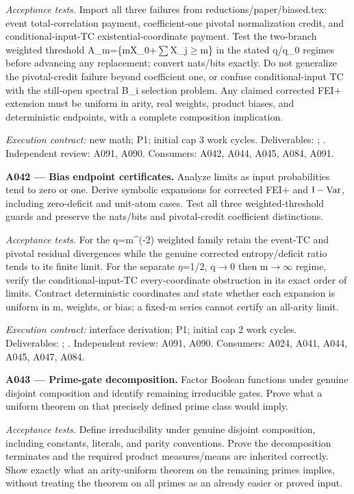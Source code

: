 \documentclass[11pt]{article}
\newcommand{\Var}{\operatorname{Var}}\newcommand{\wh}[1]{\widehat{#1}}
\begin{document}
\emph{Acceptance tests.} Import all three failures from reductions/paper/biased.tex: event total-correlation payment, coefficient-one pivotal normalization credit, and conditional-input-TC existential-coordinate payment. Test the two-branch weighted threshold A\_m=\{mX\_0+$\sum$X\_j$\ge$m\} in the stated q/q\_0 regimes before advancing any replacement; convert nats/bits exactly. Do not generalize the pivotal-credit failure beyond coefficient one, or confuse conditional-input TC with the still-open spectral B\_i selection problem. Any claimed corrected FEI+ extension must be uniform in arity, real weights, product biases, and deterministic endpoints, with a complete composition implication.

{\small\emph{Execution contract:} new math; P1; initial cap 3 work cycles. Deliverables: ; . Independent review: A091, A090. Consumers: A042, A044, A045, A084, A091.}

\textbf{A042 --- Bias endpoint certificates.} Analyze limits as input probabilities tend to zero or one. Derive symbolic expansions for corrected FEI+ and $\I-\Var$, including zero-deficit and unit-atom cases. Test all three weighted-threshold guards and preserve the nats/bits and pivotal-credit coefficient distinctions.

\emph{Acceptance tests.} For the q=m\textasciicircum{}(-2) weighted family retain the event-TC and pivotal residual divergences while the genuine corrected entropy/deficit ratio tends to its finite limit. For the separate $\eta$=1/2, q$\to$0 then m$\to$$\infty$ regime, verify the conditional-input-TC every-coordinate obstruction in its exact order of limits. Contract deterministic coordinates and state whether each expansion is uniform in m, weights, or bias; a fixed-m series cannot certify an all-arity limit.

{\small\emph{Execution contract:} interface derivation; P1; initial cap 2 work cycles. Deliverables: ; . Independent review: A091, A090. Consumers: A024, A041, A044, A045, A047, A084.}

\textbf{A043 --- Prime-gate decomposition.} Factor Boolean functions under genuine disjoint composition and identify remaining irreducible gates. Prove what a uniform theorem on that precisely defined prime class would imply.

\emph{Acceptance tests.} Define irreducibility under genuine disjoint composition, including constants, literals, and parity conventions. Prove the decomposition terminates and the required product measures/means are inherited correctly. Show exactly what an arity-uniform theorem on the remaining primes implies, without treating the theorem on all primes as an already easier or proved input.
\end{document}
